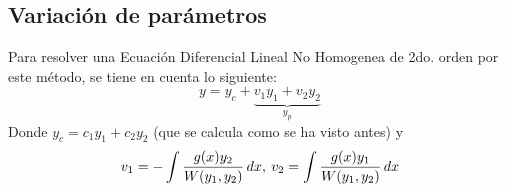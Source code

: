 \documentclass[letterpaper, 12pt]{article}
\begin{document}
\begin{justify}
        \subsection{Variación de parámetros}
        \justify
        Para resolver una Ecuación Diferencial Lineal No Homogenea de 2do. orden por este método, se tiene en cuenta lo siguiente:
        {\large\[y=y_c+\underbrace{v_1y_1+v_2y_2}_{y_p}\]}
        Donde \(y_c=c_1y_1+c_2y_2\) (que se calcula como se ha visto antes) y
        {\large\[v_1=-\int {g(x)y_2 \over W(y_1,y_2)}\, dx,\: v_2=\int {g(x)y_1 \over W(y_1,y_2)}\, dx\]}
    \end{justify}
\end{document}
